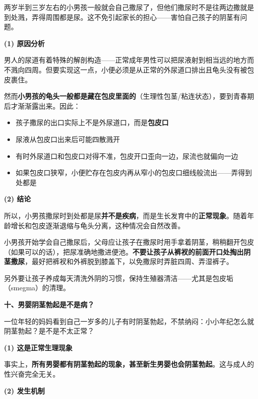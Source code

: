 \begin{enumerate}
两岁半到三岁左右的小男孩一般就会自己撒尿了，但他们撒尿时不是往两边撒就是到处溅，弄得周围都是尿。这不免引起家长的担心——害怕自己孩子的阴茎有问题。

\vspace{0.5em}
\noindent\textbf{(1) 原因分析}

男人的尿道有着特殊的解剖构造——正常成年男性可以把尿液射到相当远的地方而不溅向四周。但要实现这一点，小便必须是从正常的外尿道口排出且龟头没有被包皮裹住。

然而\textbf{小男孩的龟头一般都是藏在包皮里面的}（生理性包茎/粘连状态），要到青春期后才渐渐露出来。因此：
\begin{itemize}
	\item 孩子撒尿的出口实际上不是外尿道口，而是\textbf{包皮口}
	\item 尿液从包皮口出来后可能四散溅开
	\item 有时外尿道口和包皮口对得不准，包皮开口歪向一边，尿流也就偏向一边
	\item 如果包皮口狭窄，小便贮存在包皮内再从窄小的包皮口细线般流出——弄得到处都是
\end{itemize}

\vspace{0.3em}
\noindent\textbf{(2) 结论}

所以，小男孩撒尿时到处都是尿\textbf{并不是疾病}，而是生长发育中的\textbf{正常现象}。随着年龄增长和包皮逐渐退缩与龟头分离，这种情况会自然改善。

\begin{tcolorbox}[colback=pink!5!white,colframe=red!50!black,title=贴心小叮咛]
小男孩开始学会自己撒尿后，父母应让孩子在撒尿时用手拿着阴茎，稍稍翻开包皮（如果可以的话），把尿准确地撒进便池。\textbf{不要让孩子从裤衩的前面开口处掏出阴茎撒尿}，最好把裤衩和外裤脱到膝盖下，以免撒尿时弄脏四周、弄湿裤子。

另外要让孩子养成每天清洗外阴的习惯，保持生殖器清洁——尤其是包皮垢（smegma）的清理。
\end{tcolorbox}

\vspace{0.8em}
\noindent\textbf{十、男婴阴茎勃起是不是病？}

一位年轻的妈妈看到自己一岁多的儿子有时阴茎勃起，不禁纳闷：小小年纪怎么就阴茎勃起？是不是不太正常？

\vspace{0.5em}
\noindent\textbf{(1) 这是正常生理现象}

事实上，\textbf{所有男婴都有阴茎勃起的现象，甚至新生男婴也会阴茎勃起}。这与成人的性兴奋完全无关。

\vspace{0.3em}
\noindent\textbf{(2) 发生机制}


\end{enumerate}
